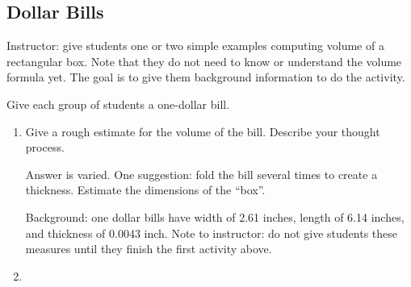 \documentclass{article}
\begin{document}
\subsection*{Dollar Bills}

\begin{notes}Instructor: give students one or two simple examples computing volume of a rectangular
box. Note that they do not need to know or understand the volume formula yet. The goal
is to give them background information to do the activity.

Give each group of students a one-dollar bill. \end{notes}
\begin{enumerate}
\item  Give a rough estimate for the volume of the bill. Describe your thought process.

  \vspace{2in}
  
\begin{notes}
  Answer is varied. One suggestion: fold the bill several times to create a thickness.
Estimate the dimensions of the ``box''.
\end{notes}
\student{\vspace{1in}}
\begin{notes}
  Background: one dollar bills have width of 2.61 inches, length of 6.14 inches, and thickness
of 0.0043 inch. Note to instructor: do not give students these measures until they finish
the first activity above.
\end{notes}
\item{}


\end{enumerate}
\end{document}
